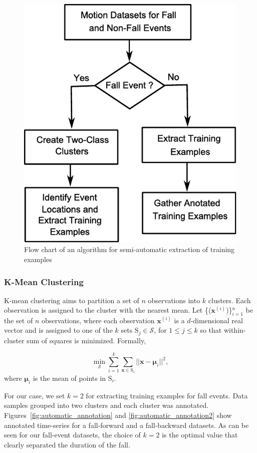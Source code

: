 \documentclass[]{IEEEtran}
\begin{document}
\begin{figure}[!htb]
	\centering
		\includegraphics[width = 0.6\columnwidth]{figures/FlowChartAlgoForTrainingExamples.pdf}
	\caption{Flow chart of an algorithm for semi-automatic extraction of training 
	examples}
	\label{fig:FlowChartforAlgorTrainingExamples}
\end{figure}

\subsubsection{K-Mean Clustering\cite{Bishop:2006:PRM:1162264}} K-mean
clustering aims to partition a set of $n$ observations into $k$ clusters. Each
observation is assigned to the cluster with the nearest mean. Let
\{($\mathbf{x}^{(i)}$)\}$_{i=1}^n$  be the set of $n$ observations, where each
observation $\mathbf{x}^{(i)}$ is a $d$-dimensional real vector and is assigned
to one of the $k$ sets $\mathrm{S}_j \in \mathcal{S}$, for $ 1 \leq  j \leq k$
so that within-cluster sum of squares is minimized. Formally,

$$ \min _{\mathcal{S}} \sum_{i=1}^{k} \sum_{\mathbf{x} \in \mathrm{S}_i} ||
\mathbf{x} - \boldsymbol{\mu}_i ||^2,$$ where $\boldsymbol{\mu}_i $ is the mean
of points in $\mathrm{S}_i$.

For our case, we set $k = 2$ for extracting  training examples for fall events.
Data samples grouped into two clusters and  each cluster was annotated.
Figures~\ref{fig:automatic_annotation} and \ref{fig:automatic_annotation2}
show annotated time-series for a fall-forward and a fall-backward datasets. As
can be seen for our fall-event datasets, the choice of $k=2$ is the optimal
value that clearly separated the duration of the fall. 
\end{document}

